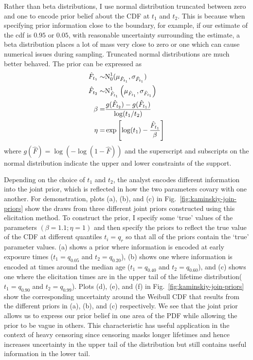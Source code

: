 Rather than beta distributions, I use normal distribution truncated between zero and one to encode prior belief about the CDF at $t_1$ and $t_2$. This is because when specifying prior information close to the boundary, for example, if our estimate of the cdf is $0.95$ or $0.05$, with reasonable uncertainty surrounding the estimate, a beta distribution places a lot of mass very close to zero or one which can cause numerical issues during sampling. Truncated normal distributions are much better behaved. The prior can be expressed as
\begin{align*}
    \hat{F}_{t_1} \sim & \hbox{N}^{1}_{0}(\mu_{\hat{F}_{t_1}}, \sigma_{\hat{F}_{t_1}})             \\
    \hat{F}_{t_2} \sim & \hbox{N}^{1}_{\hat{F}_{t_1}}\left(\mu_{\hat{F}_{t_1}}, \sigma_{\hat{F}_{t_1}}\right) \\
    \beta            = & \frac{g(\hat{F}_{t_2}) - g(\hat{F}_{t_1})}{\log(t_1 / t_2)}               \\
    \eta             = & \exp\left[\log(t_1) - \frac{\hat{F}_{t_1}}{\beta}\right]
\end{align*}
where $g(\hat{F}) = \log(-\log(1 - \hat{F}))$ and the superscript and subscripts on the normal distribution indicate the upper and lower constraints of the support.

Depending on the choice of $t_1$ and $t_2$, the analyst encodes different information into the joint prior, which is reflected in how the two parameters covary with one another. For demonstration, plots (a), (b), and (c) in Fig.~\ref{fig:kaminskiy-join-priors} show the draws from three different joint priors constructed using this elicitation method. To construct the prior, I specify some `true' values of the parameters $(\beta = 1.1; \eta = 1)$ and then specify the priors to reflect the true value of the CDF at different quantiles $t_i = q_r$ so that all of the priors contain the `true' parameter values. (a) shows a prior where information is encoded at early exposure times ($t_1 = q_{0.05}$ and $t_2 = q_{0.20}$), (b) shows one where information is encoded at times around the median age ($t_1 = q_{0.40}$ and $t_2 = q_{0.60}$), and (c) shows one where the elicitation times are in the upper tail of the lifetime distribution($t_1 = q_{0.90}$ and $t_2 = q_{0.99}$). Plots (d), (e), and (f) in Fig.~\ref{fig:kaminskiy-join-priors} show the corresponding uncertainty around the Weibull CDF that results from the different priors in (a), (b), and (c) respectively. We see that the joint prior allows us to express our prior belief in one area of the PDF while allowing the prior to be vague in others. This characteristic has useful application in the context of heavy censoring since censoring masks longer lifetimes and hence increases uncertainty in the upper tail of the distribution but still contains useful information in the lower tail.

